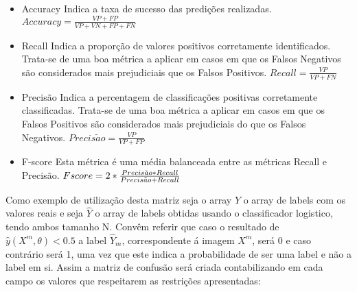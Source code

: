 \begin{itemize}
  \item Accuracy\hfill\newline
  \hfill\newline
  Indica a taxa de sucesso das predições realizadas.\hfill\newline
  \hfill\newline
  $Accuracy = \frac{VP + FP}{VP+VN+FP+FN}$
  \hfill\newline
  \item Recall\hfill\newline
  \hfill\newline
  Indica a proporção de valores positivos corretamente identificados. Trata-se de uma boa métrica a aplicar em casos em que os Falsos Negativos são considerados mais prejudiciais que os Falsos Positivos.
  \hfill\newline
  \hfill\newline
  $Recall = \frac{VP}{VP+FN}$
  \hfill\newline
  \item Precisão\hfill\newline
  \hfill\newline
  Indica a percentagem de classificações positivas corretamente classificadas. Trata-se de uma boa métrica a aplicar em casos em que os Falsos Positivos são considerados mais prejudiciais do que os Falsos Negativos.
  \hfill\newline
  \hfill\newline
  $Precis\tilde{a}o = \frac{VP}{VP+FP}$
  \hfill\newpage
  \item F-score\hfill\newline
  \hfill\newline
  Esta métrica é uma média balanceada entre as métricas Recall e Precisão.
  \hfill\newline
  \hfill\newline
  $F\-score = 2*\frac{Precis\tilde{a}o * Recall}{Precis\tilde{a}o + Recall}$ 
\end{itemize}

Como exemplo de utilização desta matriz seja o array $Y$ o array de labels com os valores reais e seja $\hat{Y}$ o array de labels obtidas usando o classificador logistico, tendo ambos tamanho N. Convêm referir que caso o resultado de $\hat{y}(X^m,\theta) < 0.5$ a label $\hat{Y}_m$, correspondente á imagem $X^m$, será 0 e caso contrário será 1, uma vez que este indica a probabilidade de ser uma label e não a label em si\cite{ref2,ref3}. Assim a matriz de confusão será criada contabilizando em cada campo os valores que respeitarem as restrições apresentadas:


